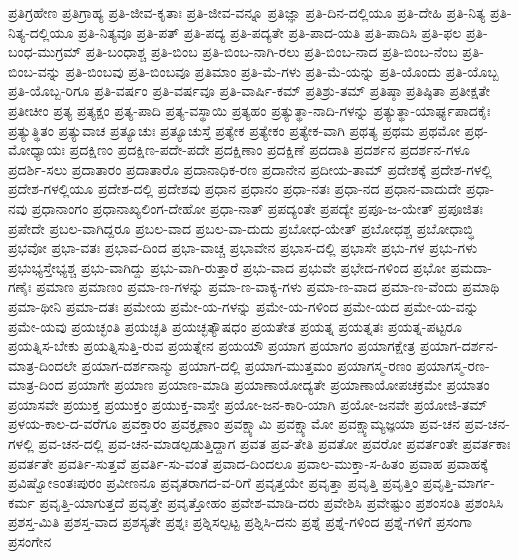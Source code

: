 {ಪ್ರತಿಗ್ರಹೇಣ
ಪ್ರತಿಗ್ರಾಹ್ಯ
ಪ್ರತಿ-ಜೀವ-ಕೃತಾಃ
ಪ್ರತಿ-ಜೀವ-ವನ್ನೂ
ಪ್ರತಿಜ್ಞಾ
ಪ್ರತಿ-ದಿನ-ದಲ್ಲಿಯೂ
ಪ್ರತಿ-ದೇಹಿ
ಪ್ರತಿ-ನಿತ್ಯ
ಪ್ರತಿ-ನಿತ್ಯ-ದಲ್ಲಿಯೂ
ಪ್ರತಿ-ನಿತ್ಯವೂ
ಪ್ರತಿ-ಪತ್
ಪ್ರತಿ-ಪದ್ಯ
ಪ್ರತಿ-ಪದ್ಯತೇ
ಪ್ರತಿ-ಪಾದ-ಯತಿ
ಪ್ರತಿ-ಪಾದಿಸಿ
ಪ್ರತಿ-ಫಲ
ಪ್ರತಿ-ಬಂಧ-ಮುಗ್ರಮ್
ಪ್ರತಿ-ಬಂಧಾಶ್ಚ
ಪ್ರತಿ-ಬಿಂಬ
ಪ್ರತಿ-ಬಿಂಬ-ನಾಗಿ-ರಲು
ಪ್ರತಿ-ಬಿಂಬ-ನಾದ
ಪ್ರತಿ-ಬಿಂಬ-ನೆಂಬ
ಪ್ರತಿ-ಬಿಂಬ-ವನ್ನು
ಪ್ರತಿ-ಬಿಂಬವು
ಪ್ರತಿ-ಬಿಂಬವೂ
ಪ್ರತಿಮಾಂ
ಪ್ರತಿ-ಮೆ-ಗಳು
ಪ್ರತಿ-ಮೆ-ಯನ್ನು
ಪ್ರತಿ-ಯೊಂದು
ಪ್ರತಿ-ಯೊಬ್ಬ
ಪ್ರತಿ-ಯೊಬ್ಬ-ರಿಗೂ
ಪ್ರತಿ-ವರ್ಷಂ
ಪ್ರತಿ-ವರ್ಷವೂ
ಪ್ರತಿ-ವಾರ್ಷಿ-ಕಮ್
ಪ್ರತಿಶ್ರು-ತಮ್
ಪ್ರತಿಷ್ಠಾ
ಪ್ರತಿಷ್ಠಿತಾ
ಪ್ರತೀಕ್ಷತೇ
ಪ್ರತೀಚೀಂ
ಪ್ರತ್ಯ
ಪ್ರತ್ಯಕ್ಷಂ
ಪ್ರತ್ಯ-ಪಾದಿ
ಪ್ರತ್ಯ-ವಸ್ಥಾಯಿ
ಪ್ರತ್ಯಹಂ
ಪ್ರತ್ಯುತ್ಥಾ-ನಾದಿ-ಗಳನ್ನು
ಪ್ರತ್ಯುತ್ಥಾ-ಯಾರ್ಘ್ಯಪಾದಕೈಃ
ಪ್ರತ್ಯುತ್ಥಿತಂ
ಪ್ರತ್ಯುವಾಚ
ಪ್ರತ್ಯೂಚುಃ
ಪ್ರತ್ಯೂಚುಸ್ತೆ
ಪ್ರತ್ಯೇಕ
ಪ್ರತ್ಯೇಕಂ
ಪ್ರತ್ಯೇಕ-ವಾಗಿ
ಪ್ರಥತ್ಯ
ಪ್ರಥಮ
ಪ್ರಥಮೋ
ಪ್ರಥ-ಮೋಧ್ಯಾಯಃ
ಪ್ರದಕ್ಷಿಣಂ
ಪ್ರದಕ್ಷಿಣ-ಪದೇ-ಪದೇ
ಪ್ರದಕ್ಷಿಣಾಂ
ಪ್ರದಕ್ಷಿಣೆ
ಪ್ರದದಾತಿ
ಪ್ರದರ್ಶನ
ಪ್ರದರ್ಶನ-ಗಳೂ
ಪ್ರದರ್ಶಿ-ಸಲು
ಪ್ರದಾತಾರಂ
ಪ್ರದಾತಾರೊ
ಪ್ರದಾನಾಧಿಕ-ರಣ
ಪ್ರದಾನೇನ
ಪ್ರದೀಯ-ತಾಮ್
ಪ್ರದೇಶಕ್ಕೆ
ಪ್ರದೇಶ-ಗಳಲ್ಲಿ
ಪ್ರದೇಶ-ಗಳಲ್ಲಿಯೂ
ಪ್ರದೇಶ-ದಲ್ಲಿ
ಪ್ರದೇಶವು
ಪ್ರಧಾನ
ಪ್ರಧಾನಂ
ಪ್ರಧಾ-ನತಃ
ಪ್ರಧಾ-ನದ
ಪ್ರಧಾನ-ವಾದುದೇ
ಪ್ರಧಾ-ನವು
ಪ್ರಧಾನಾಂಗಂ
ಪ್ರಧಾನಾಖ್ಯಲಿಂಗ-ದೇಹೋ
ಪ್ರಧಾ-ನಾತ್
ಪ್ರಪದ್ಯಂತೇ
ಪ್ರಪದ್ಯೇ
ಪ್ರಪೂ-ಜ-ಯೇತ್
ಪ್ರಪೂಜಿತಃ
ಪ್ರಪೇದೇ
ಪ್ರಬಲ-ವಾಗಿದ್ದರೂ
ಪ್ರಬಲ-ವಾದ
ಪ್ರಬಲ-ವಾ-ದುದು
ಪ್ರಬೋಧ-ಯೇತ್
ಪ್ರಬೋಧಶ್ಚ
ಪ್ರಬೋಧಾಬ್ಧಿ
ಪ್ರಭವೋ
ಪ್ರಭಾ-ವತಃ
ಪ್ರಭಾವ-ದಿಂದ
ಪ್ರಭಾ-ವಾಚ್ಚ
ಪ್ರಭಾವೇನ
ಪ್ರಭಾಸ-ದಲ್ಲಿ
ಪ್ರಭಾಸೇ
ಪ್ರಭು-ಗಳ
ಪ್ರಭು-ಗಳು
ಪ್ರಭುಭ್ಯಸ್ತೇಭ್ಯಶ್ಚ
ಪ್ರಭು-ವಾಗಿದ್ದು
ಪ್ರಭು-ವಾಗಿ-ರುತ್ತಾರೆ
ಪ್ರಭು-ವಾದ
ಪ್ರಭುವೇ
ಪ್ರಭೇದ-ಗಳಿಂದ
ಪ್ರಭೋ
ಪ್ರಮದಾ-ಗಣೈಃ
ಪ್ರಮಾಣ
ಪ್ರಮಾಣಂ
ಪ್ರಮಾ-ಣ-ಗಳನ್ನು
ಪ್ರಮಾ-ಣ-ವಾಕ್ಯ-ಗಳು
ಪ್ರಮಾ-ಣ-ವಾದ
ಪ್ರಮಾ-ಣ-ವೆಂದು
ಪ್ರಮಾಥಿ
ಪ್ರಮಾ-ಥೀನಿ
ಪ್ರಮಾ-ದತಃ
ಪ್ರಮೇಯ
ಪ್ರಮೇ-ಯ-ಗಳನ್ನು
ಪ್ರಮೇ-ಯ-ಗಳಿಂದ
ಪ್ರಮೇ-ಯದ
ಪ್ರಮೇ-ಯ-ವನ್ನು
ಪ್ರಮೇ-ಯವು
ಪ್ರಯಚ್ಛಂತಿ
ಪ್ರಯಚ್ಛತಿ
ಪ್ರಯಚ್ಛತ್ಯೌಷಧಂ
ಪ್ರಯತೇತ
ಪ್ರಯತ್ನ
ಪ್ರಯತ್ನತಃ
ಪ್ರಯತ್ನ-ಪಟ್ಟರೂ
ಪ್ರಯತ್ನಿಸ-ಬೇಕು
ಪ್ರಯತ್ನಿಸುತ್ತಿ-ರುವ
ಪ್ರಯತ್ನೇನ
ಪ್ರಯಯೌ
ಪ್ರಯಾಗ
ಪ್ರಯಾಗಂ
ಪ್ರಯಾಗಕ್ಷೇತ್ರ
ಪ್ರಯಾಗ-ದರ್ಶನ-ಮಾತ್ರ-ದಿಂದಲೇ
ಪ್ರಯಾಗ-ದರ್ಶನಾನ್ಮು
ಪ್ರಯಾಗ-ದಲ್ಲಿ
ಪ್ರಯಾಗ-ಮುತ್ತಮಂ
ಪ್ರಯಾಗಸ್ಮ-ರಣಂ
ಪ್ರಯಾಗಸ್ಮ-ರಣ-ಮಾತ್ರ-ದಿಂದ
ಪ್ರಯಾಗೇ
ಪ್ರಯಾಣ
ಪ್ರಯಾಣ-ಮಾಡಿ
ಪ್ರಯಾಣಾಯೋದ್ಯತೇ
ಪ್ರಯಾಣಾಯೋಪಚಕ್ರಮೇ
ಪ್ರಯಾತಂ
ಪ್ರಯಾಸವೇ
ಪ್ರಯುಕ್ತ
ಪ್ರಯುಕ್ತಂ
ಪ್ರಯುಕ್ತ-ವಾಸ್ತೇ
ಪ್ರಯೋ-ಜನ-ಕಾರಿ-ಯಾಗಿ
ಪ್ರಯೋ-ಜನವೇ
ಪ್ರಯೋಜಿ-ತಮ್
ಪ್ರಳಯ-ಕಾಲ-ದ-ವರೆಗೂ
ಪ್ರವಕ್ತಾರಂ
ಪ್ರವಕ್ರೄಣಾಂ
ಪ್ರವಕ್ಷ್ಯಾಮಿ
ಪ್ರವಕ್ಷ್ಯಾಮೋ
ಪ್ರವಕ್ಷ್ಯಾಮ್ಯಜ್ಞಯಾ
ಪ್ರವ-ಚನ
ಪ್ರವ-ಚನ-ಗಳಲ್ಲಿ
ಪ್ರವ-ಚನ-ದಲ್ಲಿ
ಪ್ರವ-ಚನ-ಮಾಡಲ್ಪಡುತ್ತಿದ್ದಾಗ
ಪ್ರವತ
ಪ್ರವ-ತೇತಿ
ಪ್ರವತೋ
ಪ್ರವರೋ
ಪ್ರವರ್ತಂತೇ
ಪ್ರವರ್ತಕಾಃ
ಪ್ರವರ್ತತೇ
ಪ್ರವರ್ತಿ-ಸುತ್ತವೆ
ಪ್ರವರ್ತಿ-ಸು-ವಂತೆ
ಪ್ರವಾದ-ದಿಂದಲೂ
ಪ್ರವಾಲ-ಮುಕ್ತಾ-ಸ-ಹಿತಂ
ಪ್ರವಾಹ
ಪ್ರವಾಹಕ್ಕೆ
ಪ್ರವಿಷ್ವೋಽಂತಃಪುರಂ
ಪ್ರವೀಣನೂ
ಪ್ರವೃತರಾಗದ-ವ-ರಿಗೆ
ಪ್ರವೃತ್ತಯೇ
ಪ್ರವೃತ್ತಾ
ಪ್ರವೃತ್ತಿ
ಪ್ರವೃತ್ತಿಂ
ಪ್ರವೃತ್ತಿ-ಮಾರ್ಗ-ಕರ್ಮ
ಪ್ರವೃತ್ತಿ-ಯಾಗುತ್ತದೆ
ಪ್ರವೃತ್ತೇ
ಪ್ರವೃತ್ತೋಹಂ
ಪ್ರವೇಶ-ಮಾಡಿ-ದರು
ಪ್ರವೇಶಿಸಿ
ಪ್ರವೇಷ್ಟುಂ
ಪ್ರಶಂಸಂತಿ
ಪ್ರಶಂಸಿಸಿ
ಪ್ರಶಸ್ತ-ಮಿತಿ
ಪ್ರಶಸ್ತ-ವಾದ
ಪ್ರಶಸ್ಯತೇ
ಪ್ರಶ್ನಃ
ಪ್ರಶ್ನಿಸಲ್ಪಟ್ಟ
ಪ್ರಶ್ನಿಸಿ-ದನು
ಪ್ರಶ್ನೆ
ಪ್ರಶ್ನೆ-ಗಳಿಂದ
ಪ್ರಶ್ನೆ-ಗಳಿಗೆ
ಪ್ರಸಂಗಾ
ಪ್ರಸಂಗೇನ
}
